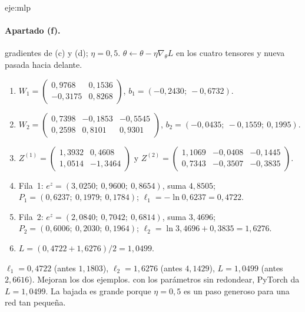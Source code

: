 \begin{solucion}{eje:mlp}
\paragraph{Apartado (f).}
\datos gradientes de (c) y (d); $\eta=0{,}5$.
\planteamiento $\theta\leftarrow\theta-\eta\nabla_\theta L$ en los cuatro tensores y nueva pasada hacia delante.
\pasos
\begin{enumerate}[label=\arabic*.]
  \item $W_1=\begin{pmatrix}0{,}9768&0{,}1536\\-0{,}3175&0{,}8268\end{pmatrix}$, $b_1=(-0{,}2430;\allowbreak\ -0{,}6732)$.
  \item $W_2=\begin{pmatrix}0{,}7398&-0{,}1853&-0{,}5545\\0{,}2598&0{,}8101&0{,}9301\end{pmatrix}$, $b_2=(-0{,}0435;\allowbreak\ -0{,}1559;\allowbreak\ 0{,}1995)$.
  \item $Z^{(1)}=\begin{pmatrix}1{,}3932&0{,}4608\\1{,}0514&-1{,}3464\end{pmatrix}$ y $Z^{(2)}=\begin{pmatrix}1{,}1069&-0{,}0408&-0{,}1445\\0{,}7343&-0{,}3507&-0{,}3835\end{pmatrix}$.
  \item Fila~1: $e^{z}=(3{,}0250;\allowbreak\ 0{,}9600;\allowbreak\ 0{,}8654)$, suma $4{,}8505$; $P_1=(0{,}6237;\allowbreak\ 0{,}1979;\allowbreak\ 0{,}1784)$; $\ell_1=-\ln 0{,}6237=0{,}4722$.
  \item Fila~2: $e^{z}=(2{,}0840;\allowbreak\ 0{,}7042;\allowbreak\ 0{,}6814)$, suma $3{,}4696$; $P_2=(0{,}6006;\allowbreak\ 0{,}2030;\allowbreak\ 0{,}1964)$; $\ell_2=\ln 3{,}4696+0{,}3835=1{,}6276$.
  \item $L=(0{,}4722+1{,}6276)/2=1{,}0499$.
\end{enumerate}
\resultado $\ell_1=0{,}4722$ (antes $1{,}1803$), $\ell_2=1{,}6276$ (antes $4{,}1429$), $L=1{,}0499$ (antes $2{,}6616$). Mejoran los dos ejemplos.
\comprobacion con los parámetros sin redondear, PyTorch da $L=1{,}0499$. La bajada es grande porque $\eta=0{,}5$ es un paso generoso para una red tan pequeña.


\end{solucion}
